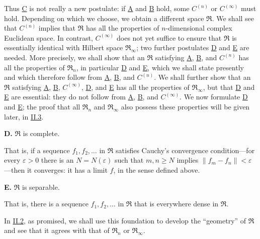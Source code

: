 \documentclass[fontsize=13pt,twoside,openany,headings=normal,parskip=false,bookmarkpackage=false,DIV=calc]{scrbook}
\begin{document}
Thus \hyperref[ax:II.Cn]{C} is not really a new postulate: if \hyperref[ax:II.A]{A} and \hyperref[ax:II.B]{B} hold, some \hyperref[ax:II.Cn]{$C^{(n)}$} or \hyperref[ax:II.Cinfty]{$C^{(\infty)}$} must hold. Depending on which we choose, we obtain a different space $\mathfrak{R}$. We shall see that \hyperref[ax:II.Cn]{$C^{(n)}$} implies that $\mathfrak{R}$ has all the properties of $n$-dimensional complex Euclidean space. In contrast, \hyperref[ax:II.Cinfty]{$C^{(\infty)}$} does not yet suffice to ensure that $\mathfrak{R}$ is essentially identical with Hilbert space $\mathfrak{R}_\infty$; two further postulates \hyperref[ax:II.D]{D} and \hyperref[ax:II.E]{E} are needed. More precisely, we shall show that an $\mathfrak{R}$ satisfying \hyperref[ax:II.A]{A}, \hyperref[ax:II.B]{B}, and \hyperref[ax:II.Cn]{$C^{(n)}$} has all the properties of $\mathfrak{R}_n$, in particular \hyperref[ax:II.D]{D} and \hyperref[ax:II.E]{E}, which we shall state presently and which therefore follow from \hyperref[ax:II.A]{A}, \hyperref[ax:II.B]{B}, and \hyperref[ax:II.Cn]{$C^{(n)}$}. We shall further show that an $\mathfrak{R}$ satisfying \hyperref[ax:II.A]{A}, \hyperref[ax:II.B]{B}, \hyperref[ax:II.Cinfty]{$C^{(\infty)}$}, \hyperref[ax:II.D]{D}, and \hyperref[ax:II.E]{E} has all the properties of $\mathfrak{R}_\infty$, but that \hyperref[ax:II.D]{D} and \hyperref[ax:II.E]{E} are essential: they do not follow from \hyperref[ax:II.A]{A}, \hyperref[ax:II.B]{B}, and \hyperref[ax:II.Cinfty]{$C^{(\infty)}$}. We now formulate \hyperref[ax:II.D]{D} and \hyperref[ax:II.E]{E}; the proof that all $\mathfrak{R}_n$ and $\mathfrak{R}_\infty$ also possess these properties will be given later, in \hyperref[sec:II.3]{II.3}.

\leavevmode{}\textbf{D.}\label{ax:II.D} $\mathfrak{R}$ is complete.

That is, if a sequence $f_1,f_2,\ldots$ in $\mathfrak{R}$ satisfies Cauchy's convergence condition---for every $\varepsilon>0$ there is an $N=N(\varepsilon)$ such that $m,n\geq N$ implies $\|f_m-f_n\|<\varepsilon$---then it converges: it has a limit $f$, in the sense defined above.

\leavevmode{}\textbf{E.}\label{ax:II.E} $\mathfrak{R}$ is separable.

That is, there is a sequence $f_1,f_2,\ldots$ in $\mathfrak{R}$ that is everywhere dense in $\mathfrak{R}$.

In \hyperref[sec:II.2]{II.2}, as promised, we shall use this foundation to develop the ``geometry'' of $\mathfrak{R}$ and see that it agrees with that of $\mathfrak{R}_n$ or $\mathfrak{R}_\infty$.
\end{document}
